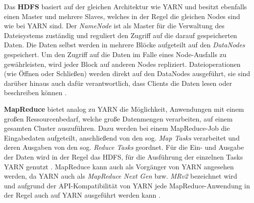Das \textbf{HDFS} basiert auf der gleichen Architektur wie YARN und besitzt ebenfalls einen Master und mehrere Slaves, welches in der Regel die gleichen Nodes sind wie bei YARN sind. Der \emph{NameNode} ist als Master für die Verwaltung des Dateisystems zuständig und reguliert den Zugriff auf die darauf gespeicherten Daten. Die Daten selbst werden in mehrere Blöcke aufgeteilt auf den \emph{DataNodes} gespeichert. Um den Zugriff auf die Daten im Falle eines Node-Ausfalls zu gewährleisten, wird jeder Block auf anderen Nodes repliziert. Dateioperationen (wie Öffnen oder Schließen) werden direkt auf den DataNodes ausgeführt, sie sind darüber hinaus auch dafür verantwortlich, dass Clients die Daten lesen oder beschreiben können \cite{HadoopHdfsDesc271}.

\textbf{MapReduce} bietet analog zu YARN die Möglichkeit, Anwendungen mit einem großen Ressourcenbedarf, welche große Datenmengen verarbeiten, auf einem gesamten Cluster auszuführen. Dazu werden bei einem MapReduce-Job die Eingabedaten aufgeteilt, anschließend von den sog. \emph{Map Tasks} verarbeitet und deren Ausgaben von den sog. \emph{Reduce Tasks} geordnet. Für die Ein- und Ausgabe der Daten wird in der Regel das HDFS, für die Ausführung der einzelnen Tasks YARN genutzt \cite{HadoopMapRedTutorial271}. MapReduce kann auch als Vorgänger von YARN angesehen werden, da YARN auch als \emph{MapReduce Next Gen} bzw. \emph{MRv2} bezeichnet wird und aufgrund der API-Kompatibilität von YARN jede MapReduce-Anwendung in der Regel auch auf YARN ausgeführt werden kann \cite{HadoopYarnArch271,HadoopYarnOverview271}.
